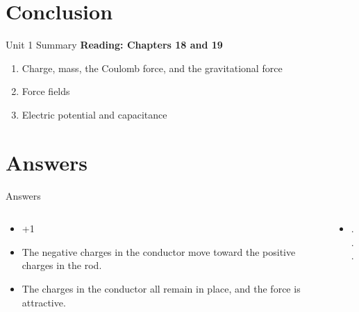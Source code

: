 \documentclass{beamer}
\begin{document}
\section{Conclusion}

\begin{frame}{Unit 1 Summary}
\textbf{Reading: Chapters 18 and 19}
\begin{enumerate}
\item Charge, mass, the Coulomb force, and the gravitational force
\item Force fields
\item Electric potential and capacitance
\end{enumerate}
\end{frame}

\section{Answers}

\begin{frame}{Answers}
\small
\begin{columns}[T]
\begin{column}{0.5\textwidth}
\begin{itemize}
\item +1
\item The negative charges in the conductor move toward the positive charges in the rod.
\item The charges in the conductor all remain in place, and the force is attractive.
\end{itemize}
\end{column}
\begin{column}{0.5\textwidth}
\begin{itemize}
\item ...
\end{itemize}
\end{column}
\end{columns}
\end{frame}
\end{document}
